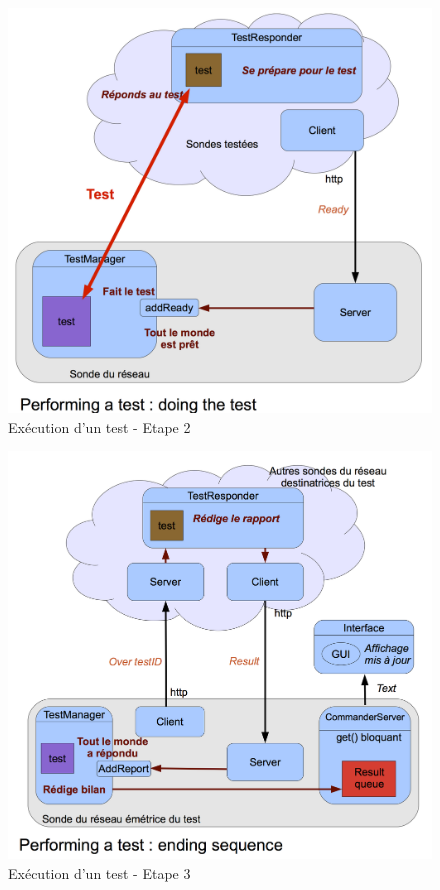\documentclass[a4paper,11pt]{article}
\begin{document}
\begin{figure}[!ht]
\centering\includegraphics[width=0.8\linewidth]{img/graphTest2.png}
\caption{Exécution d'un test - Etape 2}
\end{figure}

\begin{figure}[!ht]
\centering\includegraphics[width=\linewidth]{img/graphTest3.png}
\caption{Exécution d'un test - Etape 3}
\end{figure}
\end{document}
